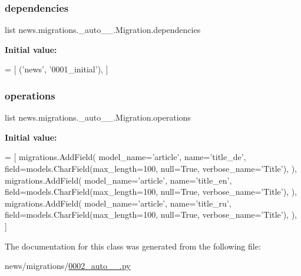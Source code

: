 \subsubsection{\texorpdfstring{dependencies}{dependencies}}
{\footnotesize\ttfamily list news.\+migrations.\+\_\+auto\+\_\+\_.\+Migration.\+dependencies\hspace{0.3cm}{\ttfamily [static]}}

{\bfseries Initial value\+:}
\begin{DoxyCode}
=  [
        (\textcolor{stringliteral}{'news'}, \textcolor{stringliteral}{'0001\_initial'}),
    ]
\end{DoxyCode}
\mbox{\label{classnews_1_1migrations_1_10002__auto__20181009__2006_1_1_migration_a243cfcb5672fe1a8555d980b0521dafa}} 
\subsubsection{\texorpdfstring{operations}{operations}}
{\footnotesize\ttfamily list news.\+migrations.\+\_\+auto\+\_\+\_.\+Migration.\+operations\hspace{0.3cm}{\ttfamily [static]}}

{\bfseries Initial value\+:}
\begin{DoxyCode}
=  [
        migrations.AddField(
            model\_name=\textcolor{stringliteral}{'article'},
            name=\textcolor{stringliteral}{'title\_de'},
            field=models.CharField(max\_length=100, null=\textcolor{keyword}{True}, verbose\_name=\textcolor{stringliteral}{'Title'}),
        ),
        migrations.AddField(
            model\_name=\textcolor{stringliteral}{'article'},
            name=\textcolor{stringliteral}{'title\_en'},
            field=models.CharField(max\_length=100, null=\textcolor{keyword}{True}, verbose\_name=\textcolor{stringliteral}{'Title'}),
        ),
        migrations.AddField(
            model\_name=\textcolor{stringliteral}{'article'},
            name=\textcolor{stringliteral}{'title\_ru'},
            field=models.CharField(max\_length=100, null=\textcolor{keyword}{True}, verbose\_name=\textcolor{stringliteral}{'Title'}),
        ),
    ]
\end{DoxyCode}


The documentation for this class was generated from the following file\+:\begin{DoxyCompactItemize}
\item 
news/migrations/\mbox{\hyperlink{0002__auto__20181009__2006_8py}{0002\+\_\+auto\+\_\+\_.\+py}}\end{DoxyCompactItemize}
